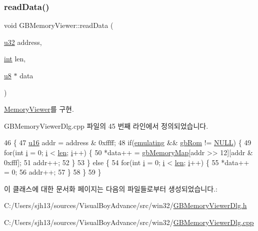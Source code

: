 \subsubsection{\texorpdfstring{read\+Data()}{readData()}}
{\footnotesize\ttfamily void G\+B\+Memory\+Viewer\+::read\+Data (\begin{DoxyParamCaption}\item[{\mbox{\hyperlink{_system_8h_a10e94b422ef0c20dcdec20d31a1f5049}{u32}}}]{address,  }\item[{\mbox{\hyperlink{_util_8cpp_a0ef32aa8672df19503a49fab2d0c8071}{int}}}]{len,  }\item[{\mbox{\hyperlink{_system_8h_aed742c436da53c1080638ce6ef7d13de}{u8}} $\ast$}]{data }\end{DoxyParamCaption})\hspace{0.3cm}{\ttfamily [virtual]}}



\mbox{\hyperlink{class_memory_viewer_a2e1b969cce8f4d60912f6b640febc54a}{Memory\+Viewer}}를 구현.



G\+B\+Memory\+Viewer\+Dlg.\+cpp 파일의 45 번째 라인에서 정의되었습니다.


\begin{DoxyCode}
46 \{
47   \mbox{\hyperlink{_system_8h_a9e6c91d77e24643b888dbd1a1a590054}{u16}} addr = address & 0xffff;
48   \textcolor{keywordflow}{if}(\mbox{\hyperlink{gb_globals_8h_af9cc36078b1b311753963297ae7f2a74}{emulating}} && \mbox{\hyperlink{gb_globals_8cpp_ae4f6bd8162474dbcfdbc54c36d7f5695}{gbRom}} != \mbox{\hyperlink{getopt1_8c_a070d2ce7b6bb7e5c05602aa8c308d0c4}{NULL}}) \{
49     \textcolor{keywordflow}{for}(\textcolor{keywordtype}{int} \mbox{\hyperlink{expr-lex_8cpp_acb559820d9ca11295b4500f179ef6392}{i}} = 0; \mbox{\hyperlink{expr-lex_8cpp_acb559820d9ca11295b4500f179ef6392}{i}} < \mbox{\hyperlink{expr-lex_8cpp_afed088663f8704004425cdae2120b9b3}{len}}; \mbox{\hyperlink{expr-lex_8cpp_acb559820d9ca11295b4500f179ef6392}{i}}++) \{
50       *data++ = \mbox{\hyperlink{gb_globals_8cpp_a71edbb615a1ec7c5b134e660531dd7dd}{gbMemoryMap}}[addr >> 12][addr & 0xfff];
51       addr++;
52     \}
53   \} \textcolor{keywordflow}{else} \{
54     \textcolor{keywordflow}{for}(\textcolor{keywordtype}{int} \mbox{\hyperlink{expr-lex_8cpp_acb559820d9ca11295b4500f179ef6392}{i}} = 0; \mbox{\hyperlink{expr-lex_8cpp_acb559820d9ca11295b4500f179ef6392}{i}} < \mbox{\hyperlink{expr-lex_8cpp_afed088663f8704004425cdae2120b9b3}{len}}; \mbox{\hyperlink{expr-lex_8cpp_acb559820d9ca11295b4500f179ef6392}{i}}++) \{
55       *data++ = 0;
56       addr++;
57     \}    
58   \}
59 \}
\end{DoxyCode}


이 클래스에 대한 문서화 페이지는 다음의 파일들로부터 생성되었습니다.\+:\begin{DoxyCompactItemize}
\item 
C\+:/\+Users/sjh13/sources/\+Visual\+Boy\+Advance/src/win32/\mbox{\hyperlink{_g_b_memory_viewer_dlg_8h}{G\+B\+Memory\+Viewer\+Dlg.\+h}}\item 
C\+:/\+Users/sjh13/sources/\+Visual\+Boy\+Advance/src/win32/\mbox{\hyperlink{_g_b_memory_viewer_dlg_8cpp}{G\+B\+Memory\+Viewer\+Dlg.\+cpp}}\end{DoxyCompactItemize}

